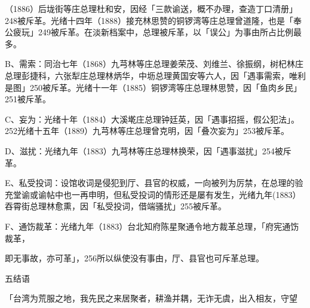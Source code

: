 \vfill
\begin{BookNotes}
\end{BookNotes}

\noindent （1886）后垅街等庄总理杜和安，因经「三款谕送，概不办理，查造丁口清册」248被斥革。光绪十四年（1888）接充林思赞的铜锣湾等庄总理曾道隆，也是「奉公疲玩」249被斥革。在淡新档案中，总理被斥革，以「误公」为事由所占比例最多。

B、需索：同治七年（1868）九芎林等庄总理姜荣茂、刘维兰、徐振纲，树杞林庄总理彭捷科，六张犁庄总理林炳华，中坜总理黄国安等六人，因「遇事需索，唯利是图」250被斥革。光绪十一年（1885）铜锣湾等庄总理林思赞，因「鱼肉乡民」251被斥革。

C、妄为：光绪十年（1884）大溪墘庄总理钟廷英，因「遇事招摇，假公犯法」。252光绪十五年（1889）九芎林等庄总理曾克明，因「叠次妄为」253被斥革。

D、滋扰：光绪九年（1883）九芎林等庄总理林换荣，因「遇事滋扰」254被斥革。

E、私受投词：设馆收词是侵犯到厅、县官的权威，一向被列为厉禁，在总理的验充堂谕或谕帖中也一再申明，但私受投词的情形还是屡有发生，光绪九年(1883）吞霄街总理林愈熏，因「私受投词，借端骚扰」255被斥革。

F、通饬裁革：光绪九年（1883）台北知府陈星聚通令地方裁革总理，「府宪通饬裁革，

\vfill
\begin{BookNotes}
\end{BookNotes}

\begin{BookQuote}
即无事故，亦可革」，256所以纵使没有事由，厅、县官也可斥革总理。
\end{BookQuote}

五结语

\begin{BookQuote}
「台湾为荒服之地，我先民之来居聚者，耕渔并耦，无诈无虞，出入相友，守望
\end{BookQuote}


